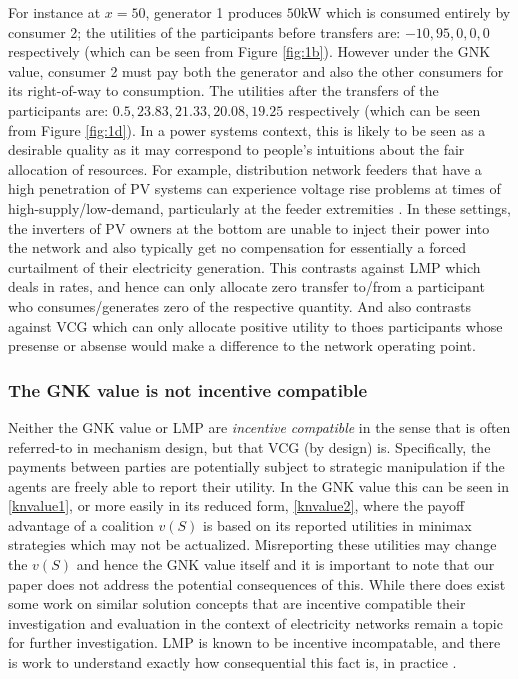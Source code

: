 For instance at $x=50$, generator 1 produces $50$kW
 which is consumed entirely by consumer 2; the utilities of the participants before transfers are: $-10, 95, 0, 0, 0$ respectively 
(which can be seen from Figure \ref{fig:1b}).
However under the GNK value, consumer 2 must pay both the generator and also the other consumers for its right-of-way to consumption.
The utilities after the transfers of the participants are: $0.5, 23.83, 21.33, 20.08, 19.25$ respectively (which can be seen from Figure \ref{fig:1d}).
In a power systems context, this is likely to be seen as a desirable quality as it may correspond to people's intuitions about the fair allocation of resources.
For example, distribution network feeders that have a high penetration of PV systems can experience voltage rise problems at 
times of high-supply/low-demand, particularly at the feeder extremities \cite{feeder1}. 
In these settings, the inverters of PV owners at the bottom are unable to inject their power into the network and also typically get no compensation for essentially a forced curtailment of their electricity generation.
This contrasts against LMP which deals in rates, and hence can only allocate zero transfer to/from a participant who consumes/generates zero of the respective quantity.
And also contrasts against VCG which can only allocate positive utility to thoes participants whose presense or absense would make a difference to the network operating point.

\subsubsection*{The GNK value is not incentive compatible}
Neither the GNK value or LMP are \emph{incentive compatible} in the sense that is often referred-to in mechanism design, but that VCG (by design) is.
Specifically, the payments between parties are potentially subject to strategic manipulation if the agents are freely able to report their utility.\cite{8054716}
In the GNK value this can be seen in \eqref{knvalue1}, or more easily in its reduced form, \eqref{knvalue2}, where the payoff advantage of a coalition $v(S)$ is based on its reported utilities in minimax strategies which may not be actualized.
Misreporting these utilities may change the $v(S)$ and hence the GNK value itself and it is important to note that our paper does not address the potential consequences of this.
While there does exist some work on similar solution concepts that are incentive compatible \cite{myerson1,Salamanca2019} their investigation and evaluation in the context of electricity networks remain a topic for further investigation.
LMP is known to be incentive incompatable, and there is work to understand exactly how consequential this fact is, in practice \cite{8054716}.

